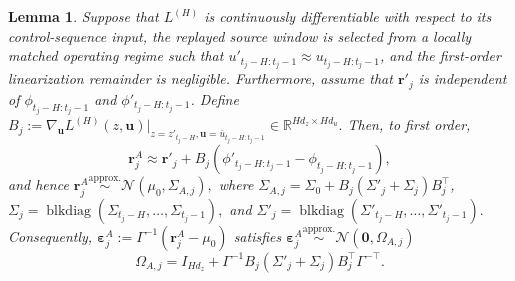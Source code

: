 \documentclass[letterpaper, 10 pt, conference]{ieeeconf}
\theoremstyle{plain}
\newtheorem{lemma}{Lemma}
\begin{document}
\begin{lemma}\label{lemma:1}
Suppose that $L^{(H)}$ is continuously differentiable with respect to its control-sequence input, the replayed source window is selected from a locally matched operating regime such that $u'_{t_j-H:t_j-1}\approx u_{t_j-H:t_j-1}$, and the first-order linearization remainder is negligible. Furthermore, assume that $\mathbf{r}'_j$ is independent of $\phi_{t_j-H:t_j-1}$ and $\phi'_{t_j-H:t_j-1}$. Define $B_j:=\nabla_{\mathbf{u}}L^{(H)}(z,\mathbf{u}) \big|_{z=z'_{t_j-H},\mathbf{u}=\bar u_{t_j-H:t_j-1}} \in\mathbb{R}^{Hd_z\times Hd_u}.$
Then, to first order,
\begin{equation}\label{eq:linearized_attack_residual}
\mathbf{r}_j^A \approx \mathbf{r}'_j + B_j\left( \phi'_{t_j-H:t_j-1} - \phi_{t_j-H:t_j-1}\right),
\end{equation}
and hence $\mathbf{r}_j^A \overset{\mathrm{approx.}}{\sim} \mathcal{N}(\mu_0,\Sigma_{A,j}),$
where $\Sigma_{A,j} = \Sigma_0+ B_j(\Sigma'_j+\Sigma_j)B_j^\top$, $\Sigma_j = \operatorname{blkdiag} \left( \Sigma_{t_j-H},\ldots,\Sigma_{t_j-1} \right),$ and $\Sigma'_j = \operatorname{blkdiag} \left( \Sigma'_{t_j-H},\ldots,\Sigma'_{t_j-1} \right).$ Consequently, $\pmb{\varepsilon}_j^A := \Gamma^{-1}(\mathbf r_j^A-\mu_0)$ satisfies $ \pmb{\varepsilon}_j^A \overset{\mathrm{approx.}}{\sim} \mathcal{N}(\mathbf 0,\Omega_{A,j})$
\begin{equation}\label{eq:attacked_standardized_distribution}
\Omega_{A,j} = I_{Hd_z} + \Gamma^{-1}B_j (\Sigma'_j+\Sigma_j) B_j^\top\Gamma^{-\top}.
\end{equation}
\end{lemma}
\end{document}
